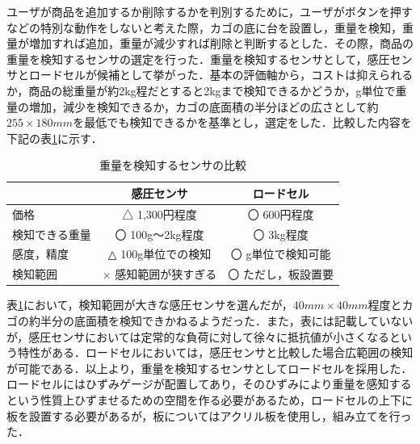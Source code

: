 ユーザが商品を追加するか削除するかを判別するために，ユーザがボタンを押すなどの特別な動作をしないと考えた際，カゴの底に台を設置し，重量を検知，重量が増加すれば追加，重量が減少すれば削除と判断するとした．その際，商品の重量を検知するセンサの選定を行った．重量を検知するセンサとして，感圧センサとロードセルが候補として挙がった．基本の評価軸から，コストは抑えられるか，商品の総重量が約2kg程だとすると2kgまで検知できるかどうか，g単位で重量の増加，減少を検知できるか，カゴの底面積の半分ほどの広さとして約$255\times180mm$を最低でも検知できるかを基準とし，選定をした．比較した内容を下記の表\ref{rodo}に示す．


\begin{table}[htb]
\begin{center}
\caption{重量を検知するセンサの比較}
\begin{tabular}{|l|c|c|} \hline
 & 感圧センサ & ロードセル \\ \hline \hline
価格 & △ 1,300円程度 & 〇 600円程度 \\
検知できる重量 & 〇 100g～2kg程度  & 〇 3kg程度 \\ 
感度，精度 & △ 100g単位での検知 & 〇 g単位で検知可能 \\
検知範囲 & × 感知範囲が狭すぎる & 〇 ただし，板設置要 \\ \hline
\end{tabular}
\label{rodo}
\end{center}
\end{table}


表\ref{rodo}において，検知範囲が大きな感圧センサを選んだが，$40mm\times40mm$程度とカゴの約半分の底面積を検知できかねるようだった．また，表には記載していないが，感圧センサにおいては定常的な負荷に対して徐々に抵抗値が小さくなるという特性がある．ロードセルにおいては，感圧センサと比較した場合広範囲の検知が可能である．以上より，重量を検知するセンサとしてロードセルを採用した．ロードセルにはひずみゲージが配置してあり，そのひずみにより重量を感知するという性質上ひずませるための空間を作る必要があるため，ロードセルの上下に板を設置する必要があるが，板についてはアクリル板を使用し，組み立てを行った．